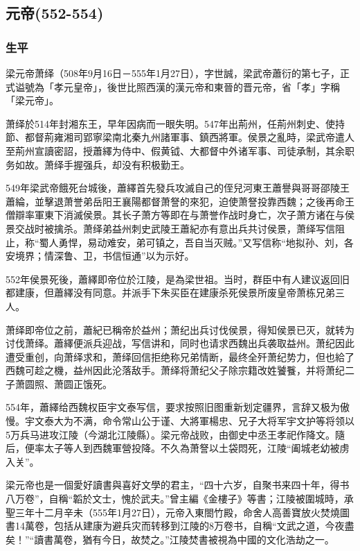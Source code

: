 
\subsection{元帝\tiny(552-554)}

\subsubsection{生平}

梁元帝萧绎（508年9月16日－555年1月27日），字世誠，梁武帝蕭衍的第七子，正式谥號為「孝元皇帝」，後世比照西漢的漢元帝和東晉的晋元帝，省「孝」字稱「梁元帝」。

萧绎於514年封湘东王，早年因病而一眼失明。547年出荊州，任荊州刺史、使持節、都督荊雍湘司郢寧梁南北秦九州諸軍事、鎮西將軍。侯景之亂時，梁武帝遣人至荊州宣讀密詔，授蕭繹为侍中、假黄钺、大都督中外诸军事、司徒承制，其余职务如故。萧绎手握强兵，却没有积极勤王。

549年梁武帝餓死台城後，蕭繹首先發兵攻滅自己的侄兒河東王蕭譽與哥哥邵陵王蕭綸，並擊退萧誉弟岳阳王襄陽都督萧詧的來犯，迫使萧詧投靠西魏；之後再命王僧辯率軍東下消滅侯景。其长子萧方等即在与萧誉作战时身亡，次子萧方诸在与侯景交战时被擒杀。萧绎弟益州刺史武陵王蕭紀亦有意出兵共讨侯景，萧绎写信阻止，称“蜀人勇悍，易动难安，弟可镇之，吾自当灭贼。”又写信称“地拟孙、刘，各安境界；情深鲁、卫，书信恒通”以为示好。

552年侯景死後，蕭繹即帝位於江陵，是為梁世祖。当时，群臣中有人建议返回旧都建康，但蕭繹没有同意。并派手下朱买臣在建康杀死侯景所废皇帝萧栋兄弟三人。

萧绎即帝位之前，蕭紀已稱帝於益州；萧纪出兵讨伐侯景，得知侯景已灭，就转为讨伐萧绎。蕭繹便派兵迎战，写信讲和，同时也请求西魏出兵袭取益州。萧纪因此遭受重创，向萧绎求和，萧绎回信拒绝称兄弟情断，最终全歼萧纪势力，但也給了西魏可趁之機，益州因此沦落敌手。萧绎将萧纪父子除宗籍改姓饕餮，并将萧纪二子萧圆照、萧圆正饿死。

554年，蕭繹给西魏权臣宇文泰写信，要求按照旧图重新划定疆界，言辞又极为傲慢。宇文泰大为不满，命令常山公于谨、大將軍楊忠、兄子大将军宇文护等将领以5万兵马进攻江陵（今湖北江陵縣）。梁元帝战败，由御史中丞王孝祀作降文。隨后，便率太子等人到西魏軍營投降。不久為萧詧以土袋悶死，江陵“阖城老幼被虏入关”。

梁元帝也是一個愛好讀書與喜好文學的君主，“四十六岁，自聚书来四十年，得书八万卷”，自稱“韜於文士，愧於武夫。”曾主編《金樓子》等書；江陵被圍城時，承聖三年十二月辛未（555年1月27日），元帝入東閤竹殿，命舍人高善寶放火焚燒圖書14萬卷，包括从建康为避兵灾而转移到江陵的8万卷书，自稱“文武之道，今夜盡矣！”“讀書萬卷，猶有今日，故焚之。”江陵焚書被視為中國的文化浩劫之一。

